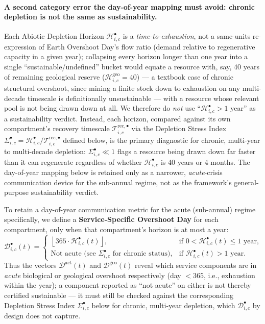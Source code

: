 \documentclass[twocolumn,10pt]{article}
\begin{document}
\paragraph{A second category error the day-of-year mapping must avoid: chronic depletion is not the same as sustainability.} Each Abiotic Depletion Horizon $\mathcal H^{\bullet}_{i,c}$ is a \emph{time-to-exhaustion}, not a same-units re-expression of Earth Overshoot Day's flow ratio (demand relative to regenerative capacity in a given year); collapsing every horizon longer than one year into a single ``sustainable/undefined'' bucket would equate a resource with, say, 40 years of remaining geological reserve ($\mathcal H^{\text{geo}}_{i,c}=40$) — a textbook case of chronic structural overshoot, since mining a finite stock down to exhaustion on any multi-decade timescale is definitionally unsustainable — with a resource whose relevant pool is not being drawn down at all. We therefore do \emph{not} use ``$\mathcal H^{\bullet}_{i,c}>1$ year'' as a sustainability verdict. Instead, each horizon, compared against its own compartment's recovery timescale $\mathcal T^{\text{rec},\bullet}_{i,c}$ via the Depletion Stress Index $\Sigma^{\bullet}_{i,c}=\mathcal H^{\bullet}_{i,c}/\mathcal T^{\text{rec},\bullet}_{i,c}$ defined below, is the primary diagnostic for chronic, multi-year to multi-decade depletion: $\Sigma^{\bullet}_{i,c}\ll1$ flags a resource being drawn down far faster than it can regenerate regardless of whether $\mathcal H^{\bullet}_{i,c}$ is 40 years or 4 months. The day-of-year mapping below is retained only as a narrower, \emph{acute}-crisis communication device for the sub-annual regime, not as the framework's general-purpose sustainability verdict.

To retain a day-of-year communication metric for the acute (sub-annual) regime specifically, we define a \textbf{Service-Specific Overshoot Day} for each compartment, only when that compartment's horizon is at most a year:
\begin{equation}
\mathcal{D}^{\bullet}_{i,c}(t) =
\begin{cases}
\left\lfloor 365 \cdot \mathcal{H}^{\bullet}_{i,c}(t) \right\rfloor, & \text{if } 0 < \mathcal{H}^{\bullet}_{i,c}(t) \le 1 \text{ year},\\
\text{Not acute (see } \Sigma^{\bullet}_{i,c} \text{ for chronic status)}, & \text{if } \mathcal{H}^{\bullet}_{i,c}(t) > 1 \text{ year}.
\end{cases} \label{eq:overshoot-day}
\end{equation}
Thus the vectors $\boldsymbol{\mathcal{D}}^{\text{act}}(t)$ and $\boldsymbol{\mathcal{D}}^{\text{geo}}(t)$ reveal which service components are in \emph{acute} biological or geological overshoot respectively (day $<365$, i.e., exhaustion within the year); a component reported as ``not acute'' on either is not thereby certified sustainable — it must still be checked against the corresponding Depletion Stress Index $\Sigma^{\bullet}_{i,c}$ below for chronic, multi-year depletion, which $\mathcal D^{\bullet}_{i,c}$ by design does not capture.
\end{document}
